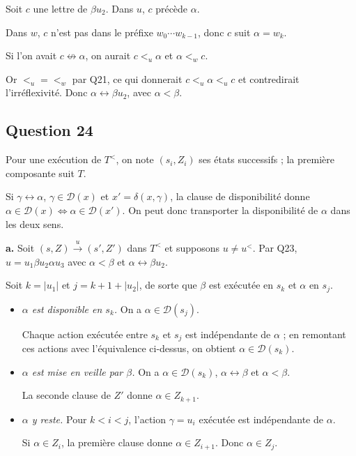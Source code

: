 \documentclass[11pt,a4paper]{article}
\newcommand{\equationajustee}[1]{%
  \sbox{\boiteequation}{$\displaystyle #1$}%
  \ifdim\wd\boiteequation>\linewidth
    \[\resizebox{\linewidth}{!}{\usebox{\boiteequation}}\]%
  \else
    \[#1\]%
  \fi}
\begin{document}
Soit \(c\) une lettre de \(\beta u_2\). Dans \(u\), \(c\) précède \(\alpha\).

Dans \(w\), \(c\) n'est pas dans le préfixe \(w_0\cdots w_{k-1}\), donc \(c\) suit \(\alpha=w_k\).

Si l'on avait \(c\not\leftrightarrow\alpha\), on aurait \(c<_u\alpha\) et \(\alpha<_wc\).

Or \(<_u=<_w\) par Q21, ce qui donnerait \(c<_u\alpha<_uc\) et contredirait l'irréflexivité. Donc \(\alpha\leftrightarrow\beta u_2\), avec \(\alpha<\beta\).

\equationajustee{\boxed{u=u^<\iff u \text{ ne s'\text{écrit} pas } u_1\beta u_2\alpha u_3 \text{ avec } \alpha<\beta,\ \alpha\leftrightarrow\beta u_2}}

\hypertarget{question-24}{%
\subsection{Question 24}\label{question-24}}

Pour une exécution de \(T^<\), on note \((s_i,Z_i)\) ses états successifs ; la première composante suit \(T\).

Si \(\gamma\leftrightarrow\alpha\), \(\gamma\in\mathcal D(x)\) et \(x'=\delta(x,\gamma)\), la clause de disponibilité donne \(\alpha\in\mathcal D(x)\iff\alpha\in\mathcal D(x')\). On peut donc transporter la disponibilité de \(\alpha\) dans les deux sens.

\textbf{a.} Soit \((s,Z)\xrightarrow{u}(s',Z')\) dans \(T^<\) et supposons \(u\neq u^<\). Par Q23, \(u=u_1\beta u_2\alpha u_3\) avec \(\alpha<\beta\) et \(\alpha\leftrightarrow\beta u_2\).

Soit \(k=|u_1|\) et \(j=k+1+|u_2|\), de sorte que \(\beta\) est exécutée en \(s_k\) et \(\alpha\) en \(s_j\).

\begin{itemize}
\item
  \emph{\(\alpha\) est disponible en \(s_k\).} On a \(\alpha\in\mathcal D(s_j)\).

  Chaque action exécutée entre \(s_k\) et \(s_j\) est indépendante de \(\alpha\) ; en remontant ces actions avec l'équivalence ci-dessus, on obtient \(\alpha\in\mathcal D(s_k)\).
\item
  \emph{\(\alpha\) est mise en veille par \(\beta\).} On a \(\alpha\in\mathcal D(s_k)\), \(\alpha\leftrightarrow\beta\) et \(\alpha<\beta\).

  La seconde clause de \(Z'\) donne \(\alpha\in Z_{k+1}\).
\item
  \emph{\(\alpha\) y reste.} Pour \(k<i<j\), l'action \(\gamma=u_i\) exécutée est indépendante de \(\alpha\).

  Si \(\alpha\in Z_i\), la première clause donne \(\alpha\in Z_{i+1}\). Donc \(\alpha\in Z_j\).
\end{itemize}
\end{document}
